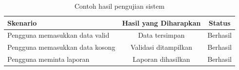 \begin{table}[H]
  \centering
  \caption{Contoh hasil pengujian sistem}
  \label{tab:hasil-pengujian}
  \begin{tabularx}{\textwidth}{YCC}
    \toprule
    \textbf{Skenario} & \textbf{Hasil yang Diharapkan} & \textbf{Status} \\
    \midrule
    Pengguna memasukkan data valid & Data tersimpan & Berhasil \\
    Pengguna memasukkan data kosong & Validasi ditampilkan & Berhasil \\
    Pengguna meminta laporan & Laporan dihasilkan & Berhasil \\
    \bottomrule
  \end{tabularx}
\end{table}
